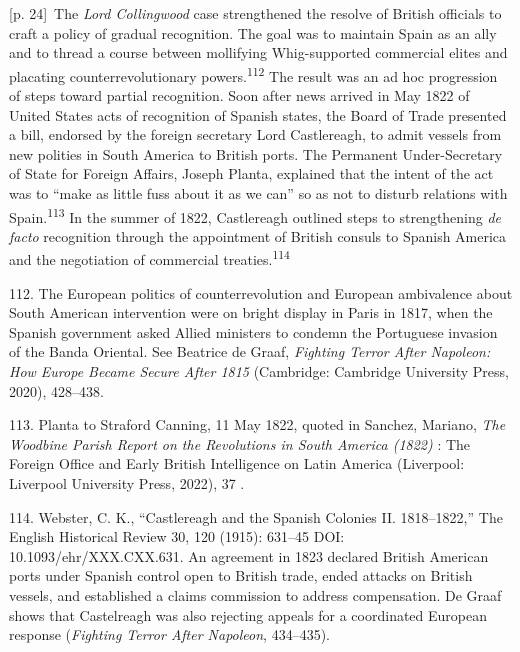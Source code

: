 \documentclass[10pt,a4paper]{article}
\begin{document}
{\scriptsize\color{gray} [p. 24]}\ The \textit{Lord Collingwood} case strengthened the resolve of British officials to craft a policy of gradual recognition. The goal was to maintain Spain as an ally and to thread a course between mollifying Whig-supported commercial elites and placating counterrevolutionary powers.\nobreak\textsuperscript{112} The result was an ad hoc progression of steps toward partial recognition. Soon after news arrived in May 1822 of United States acts of recognition of Spanish states, the Board of Trade presented a bill, endorsed by the foreign secretary Lord Castlereagh, to admit vessels from new polities in South America to British ports. The Permanent Under-Secretary of State for Foreign Affairs, Joseph Planta, explained that the intent of the act was to “make as little fuss about it as we can” so as not to disturb relations with Spain.\nobreak\textsuperscript{113} In the summer of 1822, Castlereagh outlined steps to strengthening \textit{de facto} recognition through the appointment of British consuls to Spanish America and the negotiation of commercial treaties.\nobreak\textsuperscript{114}\par{\small 112. The European politics of counterrevolution and European ambivalence about South American intervention were on bright display in Paris in 1817, when the Spanish government asked Allied ministers to condemn the Portuguese invasion of the Banda Oriental. See Beatrice de Graaf, \textit{Fighting Terror After Napoleon: How Europe Became Secure After 1815} (Cambridge: Cambridge University Press, 2020), 428–438.\par}{\small 113. Planta to Straford Canning, 11 May 1822, quoted in Sanchez, Mariano, \textit{The Woodbine Parish Report on the Revolutions in South America (1822)} : The Foreign Office and Early British Intelligence on Latin America (Liverpool: Liverpool University Press, 2022), 37 .\par}{\small 114. Webster, C. K., “Castlereagh and the Spanish Colonies II. 1818–1822,” The English Historical Review 30, 120 (1915): 631–45 DOI: 10.1093/ehr/XXX.CXX.631. An agreement in 1823 declared British American ports under Spanish control open to British trade, ended attacks on British vessels, and established a claims commission to address compensation. De Graaf shows that Castelreagh was also rejecting appeals for a coordinated European response (\textit{Fighting Terror After Napoleon}, 434–435).\par}
\end{document}
